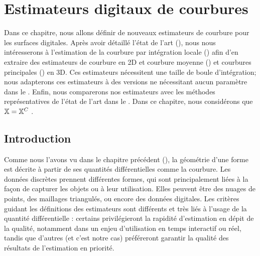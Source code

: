 %
%
%
\chapter{Estimateurs digitaux de courbures}
\label{sec:estimators}
%
%
\setcounter{minitocdepth}{4}
\minitoc
%
\newpage
%
Dans ce chapitre, nous allons définir de nouveaux estimateurs de courbure pour
les surfaces digitales. Après avoir détaillé l'état de l'art
(), nous nous intéresserons à l'estimation de la
courbure par intégration locale () afin d'en
extraire des estimateurs de courbure en 2D et courbure moyenne
() et courbures principales
() en 3D. Ces estimateurs nécessitent une taille de boule
d'intégration; nous adapterons ces estimateurs à des versions ne nécessitant
aucun paramètre dans le . Enfin, nous
comparerons nos estimateurs avec les méthodes représentatives de l'état de l'art
dans le . Dans ce chapitre, nous
considérons que $\mathbb{X} = \mathbb{X}^{C}$ .
%
\section{Introduction}
\label{sec:estimators:introduction}
%
Comme nous l'avons vu dans le chapitre précédent (), la
géométrie d'une forme est décrite à partir de ses quantités différentielles
comme la courbure.
%
%
%
Les données discrètes prennent différentes formes, qui sont principalement liées à la façon de capturer les
objets ou à leur utilisation. Elles peuvent être des nuages de points, des
maillages triangulés, ou encore des données digitales. Les critères guidant les définitions des
estimateurs sont différents et très liés à l'usage de la quantité différentielle :
certains privilégieront la rapidité d'estimation en dépit de la qualité, notamment
dans un enjeu d'utilisation en temps interactif ou réel, tandis que d'autres (et
c'est notre cas) préféreront garantir la qualité des résultats de l'estimation
en priorité.


